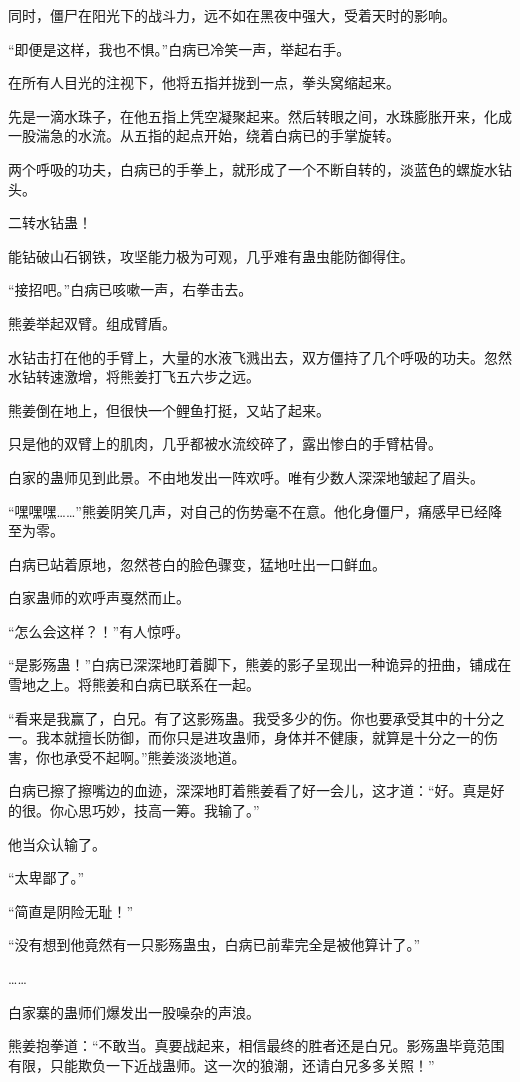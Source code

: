 \begin{this_body}
同时，僵尸在阳光下的战斗力，远不如在黑夜中强大，受着天时的影响。

“即便是这样，我也不惧。”白病已冷笑一声，举起右手。

在所有人目光的注视下，他将五指并拢到一点，拳头窝缩起来。

先是一滴水珠子，在他五指上凭空凝聚起来。然后转眼之间，水珠膨胀开来，化成一股湍急的水流。从五指的起点开始，绕着白病已的手掌旋转。

两个呼吸的功夫，白病已的手拳上，就形成了一个不断自转的，淡蓝色的螺旋水钻头。

二转水钻蛊！

能钻破山石钢铁，攻坚能力极为可观，几乎难有蛊虫能防御得住。

“接招吧。”白病已咳嗽一声，右拳击去。

熊姜举起双臂。组成臂盾。

水钻击打在他的手臂上，大量的水液飞溅出去，双方僵持了几个呼吸的功夫。忽然水钻转速激增，将熊姜打飞五六步之远。

熊姜倒在地上，但很快一个鲤鱼打挺，又站了起来。

只是他的双臂上的肌肉，几乎都被水流绞碎了，露出惨白的手臂枯骨。

白家的蛊师见到此景。不由地发出一阵欢呼。唯有少数人深深地皱起了眉头。

“嘿嘿嘿……”熊姜阴笑几声，对自己的伤势毫不在意。他化身僵尸，痛感早已经降至为零。

白病已站着原地，忽然苍白的脸色骤变，猛地吐出一口鲜血。

白家蛊师的欢呼声戛然而止。

“怎么会这样？！”有人惊呼。

“是影殇蛊！”白病已深深地盯着脚下，熊姜的影子呈现出一种诡异的扭曲，铺成在雪地之上。将熊姜和白病已联系在一起。

“看来是我赢了，白兄。有了这影殇蛊。我受多少的伤。你也要承受其中的十分之一。我本就擅长防御，而你只是进攻蛊师，身体并不健康，就算是十分之一的伤害，你也承受不起啊。”熊姜淡淡地道。

白病已擦了擦嘴边的血迹，深深地盯着熊姜看了好一会儿，这才道：“好。真是好的很。你心思巧妙，技高一筹。我输了。”

他当众认输了。

“太卑鄙了。”

“简直是阴险无耻！”

“没有想到他竟然有一只影殇蛊虫，白病已前辈完全是被他算计了。”

……

白家寨的蛊师们爆发出一股噪杂的声浪。

熊姜抱拳道：“不敢当。真要战起来，相信最终的胜者还是白兄。影殇蛊毕竟范围有限，只能欺负一下近战蛊师。这一次的狼潮，还请白兄多多关照！”


\end{this_body}
